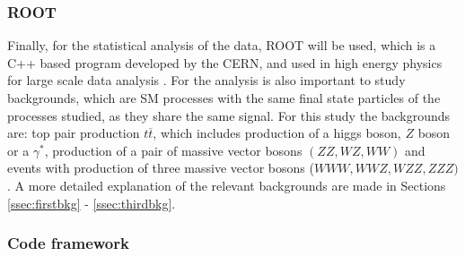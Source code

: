 



\subsubsection{ROOT} \label{ssec:root}

Finally, for the statistical analysis of the data, ROOT will be used, which is a C++ based program developed by the CERN, and used in high energy physics for large scale data analysis \cite{Brun}. For the analysis is also important to study backgrounds, which are SM processes with the same final state particles of the processes studied, as they share the same signal. For this study the backgrounds are: top pair production $t\overline t$, which includes production of a higgs boson, $Z$ boson or a $\gamma^*$, production of a pair of massive vector bosons $(ZZ, WZ, WW)$ and events with production of three massive vector bosons ($WWW, WWZ, WZZ, ZZZ)$. A more detailed explanation of the relevant backgrounds are made in Sections \ref{ssec:firstbkg} - \ref{ssec:thirdbkg}.

\subsubsection{Code framework} \label{ssec:codeframework}

